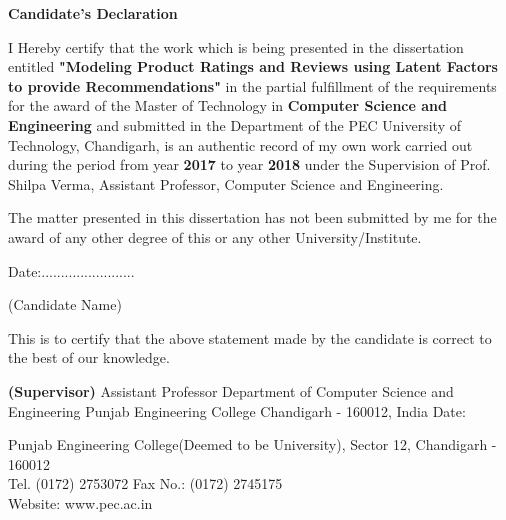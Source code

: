\documentclass[a4paper]{article}
\begin{document}
\vspace*{5px}
    \begin{figure}[h]
        {\par}
    \end{figure}
\justify
\begin{large}
\begin{center}
\textbf{Candidate's Declaration}
\end{center}


I Hereby  certify  that  the  work  which  is  being  presented  in  the dissertation entitled \textbf{"Modeling Product Ratings and Reviews using Latent Factors to provide Recommendations"} in  the partial fulfillment of the requirements for the award of the Master of Technology in \textbf{Computer Science and Engineering} and submitted in the Department of the PEC University of Technology, Chandigarh, is  an  authentic record of my own work carried out during the period from year \textbf{2017} to year \textbf{2018} under the Supervision of Prof. Shilpa Verma, Assistant Professor, Computer Science and Engineering. \par
The  matter  presented  in  this dissertation has  not  been  submitted  by  me  for  the  award  of  any other degree of this or any other University/Institute. \par


\begin{minipage}{0.5\textwidth}
Date:........................
\end{minipage}%
\begin{minipage}{0.5\textwidth}
(Candidate Name)
\end{minipage}

This  is  to  certify  that  the  above  statement  made  by  the  candidate  is  correct  to  the  best  of  our knowledge.

\begin{minipage}{0.5\textwidth}

\end{minipage}%
\begin{minipage}{0.5\textwidth}
\textbf{(Supervisor)}
Assistant Professor
Department of Computer Science and Engineering
Punjab Engineering College
Chandigarh - 160012, India
Date: 
\end{minipage}

\vfill


\begin{center}
{\color{gray}
Punjab Engineering College(Deemed to be University), Sector 12, Chandigarh - 160012\\
Tel. (0172) 2753072 Fax No.: (0172) 2745175\\
Website: www.pec.ac.in}
\end{center}


\end{large}
\end{document}
